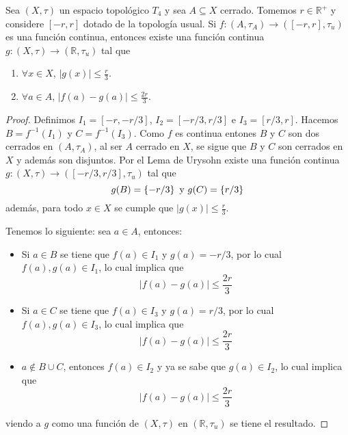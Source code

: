 \documentclass[12pt]{report}
\theoremstyle{largebreak}
\newcommand\abs[1]{\ensuremath{\left|#1\right|}}
\newcommand\cf[3]{\ensuremath{#1:#2\rightarrow#3}}
\begin{document}
    \begin{propo}
        Sea $(X,\tau)$ un espacio topológico $T_4$ y sea $A\subseteq X$ cerrado. Tomemos $r\in\mathbb{R}^+$ y considere $[-r,r]$ dotado de la topología usual. Si $\cf{f}{(A,\tau_A)}{([-r,r],\tau_u)}$ es una función continua, entonces existe una función continua $\cf{g}{(X,\tau)}{(\mathbb{R},\tau_u)}$ tal que
        \renewcommand{\theenumi}{\roman{enumi}}
        \begin{enumerate}
            \item $\forall x\in X$, $\abs{g(x)}\leq\frac{r}{3}$.
            \item $\forall a\in A$, $\abs{f(a)-g(a)}\leq\frac{2r}{3}$.
        \end{enumerate}
    \end{propo}

    \begin{proof}
        Definimos $I_1=[-r,-r/3]$, $I_2=[-r/3,r/3]$ e $I_3=[r/3,r]$. Hacemos $B=f^{-1}(I_1)$ y $C=f^{-1}(I_3)$. Como $f$ es continua entones $B$ y $C$ son dos cerrados en $(A,\tau_A)$, al ser $A$ cerrado en $X$, se sigue que $B$ y $C$ son cerrados en $X$ y además son disjuntos. Por el Lema de Urysohn existe una función continua $\cf{g}{(X,\tau)}{([-r/3,r/3],\tau_u)}$ tal que
        \begin{equation*}
            g(B)=\left\{ -r/3\right\}\textup{ y }g(C)=\left\{r/3\right\}
        \end{equation*}
        además, para todo $x\in X$ se cumple que $\abs{g(x)}\leq\frac{r}{3}$.

        Tenemos lo siguiente: sea $a\in A$, entonces:
        \begin{itemize}
            \item Si $a\in B$ se tiene que $f(a)\in I_1$ y $g(a)=-r/3$, por lo cual $f(a),g(a)\in I_1$, lo cual implica que
            \begin{equation*}
                \abs{f(a)-g(a)}\leq\frac{2r}{3}
            \end{equation*}
            \item Si $a\in C$ se tiene que $f(a)\in I_3$ y $g(a)=r/3$, por lo cual $f(a),g(a)\in I_3$, lo cual implica que
            \begin{equation*}
                \abs{f(a)-g(a)}\leq\frac{2r}{3}
            \end{equation*}
            \item $a\notin B\cup C$, entonces $f(a)\in I_2$ y ya se sabe que $g(a)\in I_2$, lo cual implica que
            \begin{equation*}
                \abs{f(a)-g(a)}\leq\frac{2r}{3}
            \end{equation*}
        \end{itemize}
        viendo a $g$ como una función de $(X,\tau)$ en $(\mathbb{R},\tau_u)$ se tiene el resultado.
    \end{proof}
    
\end{document}
